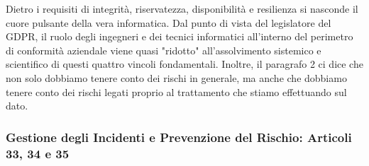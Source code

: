 Dietro i requisiti di integrità, riservatezza, disponibilità e resilienza si nasconde il cuore pulsante della vera informatica.
Dal punto di vista del legislatore del GDPR, il ruolo degli ingegneri e dei tecnici informatici all'interno del perimetro di conformità aziendale viene quasi "ridotto" all'assolvimento sistemico e scientifico di questi quattro vincoli fondamentali.
Inoltre, il paragrafo 2 ci dice che non solo dobbiamo tenere conto dei rischi in generale, ma anche che dobbiamo tenere conto dei rischi legati proprio al trattamento che stiamo effettuando sul dato.
\subsubsection*{Gestione degli Incidenti e Prevenzione del Rischio: Articoli 33, 34 e 35}

